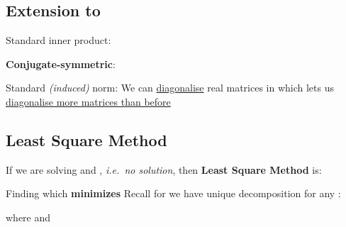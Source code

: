 \subsection*{\texorpdfstring{Extension to
            }{Extension to }}

\begin{itemize}

      \vItem
            Standard inner product:

            \begin{itemize}

                  \vItem
                        \textbf{Conjugate-symmetric}:
            \end{itemize}
      \vItem
            Standard \emph{(induced)} norm:
      \vItem
            We can \ul{diagonalise} real matrices in
             which lets us \ul{diagonalise more matrices than before}
\end{itemize}

\subsection*{Least Square Method}


If we are solving  and
, \emph{i.e.~no solution},
then \textbf{Least Square Method} is:

\begin{itemize}

      \vItem
            Finding  which \textbf{minimizes}
      \vItem
            Recall for  we have unique decomposition for
            any :

            \begin{itemize}

                  \vItem
                        where  and
            \end{itemize}
      \vItem
\end{itemize}

